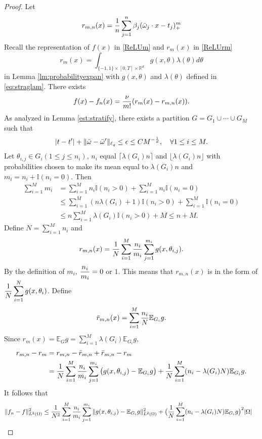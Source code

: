 \begin{proof}
Let 
$$
r_{m, n}(x)={1\over n}\sum_{j=1}^{n}\beta_j (\bar \omega_j\cdot x - t_j)_+^m
$$
Recall the representation  of $f(x)$ in \eqref{ReLUm} and $r_m(x)$ in \eqref{ReLUrm}
\begin{equation}
r_m(x) = \int_{\{-1,1\}\times [0,T]\times \mathbb{R}^{d}}  g(x, \theta)\lambda(\theta)d\theta  
\end{equation} 
in Lemma \ref{lm:probabilityexpan} with  $g(x,\theta)$ and $\lambda(\theta)$ defined in \eqref{eq:straglam}. There exists
$$
f(x) - f_n(x)= {\nu\over m!}(r_m(x) - r_{m, n}(x)).
$$ 
As analyzed in Lemma \ref{est:stratify}, there exists a partition $G=G_1\cup \cdots \cup G_M$ such that
$$
|t -t'| + \|\bar\omega - \bar\omega'\|_{\ell_q}\leq \epsilon \le C M^{-{1\over d}},\quad \forall 1\le i\le M.
$$ 
Let  $\theta_{i,j} \in G_i(1\leq j\leq n_i)$,  $n_i$ equal $\lceil \lambda(G_i)n\rceil$ and $\lfloor \lambda(G_i)n\rfloor$ with probabilities chosen to make its mean equal to $\lambda(G_i)n$ and $m_i=n_i + \mathbb{I}(n_i=0)$. Then
\begin{align} 
\sum_{i=1}^M m_i&=\sum_{i=1}^M n_i\mathbb{I}(n_i>0) + \sum_{i=1}^M n_i\mathbb{I}(n_i=0)
\\
&\le \sum_{i=1}^M (n\lambda(G_i) + 1)\mathbb{I}(n_i>0) + \sum_{i=1}^M \mathbb{I}(n_i=0)
\\
&\le  n\sum_{i=1}^M \lambda(G_i)\mathbb{I}(n_i>0) + M
\le n+M.
\end{align} 
Define $\displaystyle N=\sum_{i=1}^Mn_i$  and
$$
r_{m,n}(x)= {1\over N}\sum_{i=1}^M {n_i\over m_i} \sum_{j=1}^{m_i} g(x,\theta_{i,j}).
$$
By the definition of $m_i$, $\displaystyle {n_i\over m_i}=0$ or $1$.  This means that $r_{m,n}(x) $ is in the form of  $\displaystyle {1\over N}\sum_{i=1}^Ng(x,\theta_i)$.  Define
$$
\bar{r}_{m,n}(x)= \sum_{i=1}^M {n_i\over N}\mathbb{E}_{G_i}g.
$$
Since
$
\displaystyle r_m(x)=\mathbb{E}_G g= \sum_{i=1}^M \lambda(G_i) \mathbb{E}_{G_i}g,
$  
\begin{align}  
r_{m,n} - r_m  &= r_{m,n} - \bar{r}_{m,n} + \bar{r}_{m,n} - r_m
\\
&= {1\over N}\sum_{i=1}^M {n_i\over m_i} \sum_{j=1}^{m_i} \big (g(x,\theta_{i,j}) - \mathbb{E}_{G_i}g \big ) + {1\over N}\sum_{i=1}^M (n_i - \lambda(G_i)N)  \mathbb{E}_{G_i}g.
\end{align} 
\iffalse
It follows that 
\begin{align}  
\|f_n - f \|_{L^2(\Omega)}^2 &\le {1\over N^2}\sum_{i=1}^M {n_i\over m_i} \sum_{j=1}^{m_i} \|g(x,\theta_{i,j}) - \mathbb{E}_{G_i}g \|_{L^2(\Omega)}^2 + \big ({1\over N}\sum_{i=1}^M (n_i - \lambda(G_i)N)  \mathbb{E}_{G_i}g\big )^2|\Omega|

\end{align}
\end{proof}
